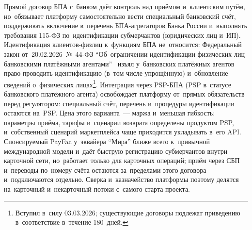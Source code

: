 Прямой договор БПА с~банком даёт контроль над приёмом и~клиентским путём,
но~обязывает платформу самостоятельно вести специальный банковский счёт,
поддерживать включение в~перечень БПА-агрегаторов Банка России и~выполнять
требования 115-ФЗ по~идентификации субмерчантов (юридических лиц и~ИП).
Идентификация клиентов-физлиц к~функциям БПА не~относится: Федеральный закон
от~20.02.2026~№~44-ФЗ \enquote{Об~ограничении идентификации физических лиц
банковскими платёжными агентами}~\cite{fz-44} изъял у~банковских платёжных агентов право проводить
идентификацию (в~том числе упрощённую) и~обновление сведений о~физических
лицах\footnote{Вступил в~силу 03.03.2026; существующие договоры подлежат
приведению в~соответствие в~течение 180~дней.}. Интеграция через PSP-БПА (PSP
в~статусе банковского платёжного агента) освобождает платформу от~прямых
обязательств перед регулятором: специальный счёт, перечень и~процедуры
идентификации остаются на~PSP. Цена этого варианта~--- маржа и~меньшая
гибкость: параметры приёма, тарифы и~сценарии возврата определены продуктом
PSP, и~собственный сценарий маркетплейса чаще приходится укладывать в~его API.
Спонсируемый PayFac у~эквайера \enquote{Мира} ближе всего к~привычной
международной модели и~даёт быструю регистрацию субмерчантов внутри карточной
сети, но~работает только для карточных операций; приём через СБП и~переводы по~номеру
счёта остаются за~пределами этого договора и~подключаются отдельно. Сверка
и~казначейство платформы поэтому делятся на~карточный и~некарточный потоки
с~самого старта проекта.
